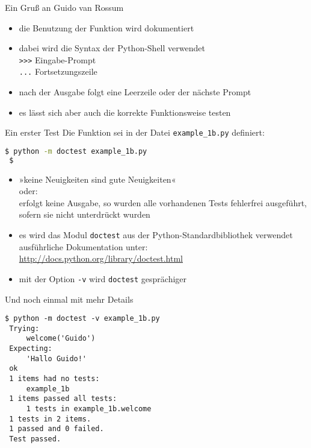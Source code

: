 \documentclass[t, utf8x, 10pt]{beamer}
\begin{document}
\begin{frame}{Ein Gruß an Guido van Rossum}
 

 \hrulefill
 \begin{itemize}
  \item die Benutzung der Funktion wird dokumentiert
  \item dabei wird die Syntax der Python-Shell verwendet\\
	\texttt{{>}{>}{>}} \quad Eingabe-Prompt\\
	\texttt{...} \quad Fortsetzungszeile
  \item nach der Ausgabe folgt eine Leerzeile oder der nächste Prompt
  \item \alert{es lässt sich aber auch die korrekte Funktionsweise testen}
 \end{itemize}
\end{frame}


\begin{frame}[fragile]{Ein erster Test}
 Die Funktion sei in der Datei \texttt{example\_1b.py} definiert:

 \begin{lstlisting}[language=bash]
 $ python -m doctest example_1b.py
 $ 
 \end{lstlisting}

 \begin{itemize}
  \item »keine Neuigkeiten sind gute Neuigkeiten«\\
	oder:\\
	erfolgt keine Ausgabe, so wurden alle vorhandenen Tests fehlerfrei
	ausgeführt, sofern sie nicht unterdrückt wurden
  \item es wird das Modul \texttt{doctest} aus der Python-Standardbibliothek
	verwendet\\
	ausführliche Dokumentation unter:
	\url{http://docs.python.org/library/doctest.html}
  \item mit der Option \texttt{-v} wird \texttt{doctest} gesprächiger
 \end{itemize}
\end{frame}


\begin{frame}[fragile]{Und noch einmal mit mehr Details}
	\begin{lstlisting}[language={}]
 $ python -m doctest -v example_1b.py
 Trying:
     welcome('Guido')
 Expecting:
     'Hallo Guido!'
 ok
 1 items had no tests:
     example_1b
 1 items passed all tests:
     1 tests in example_1b.welcome
 1 tests in 2 items.
 1 passed and 0 failed.
 Test passed.
 \end{lstlisting}
\end{frame}
\end{document}

